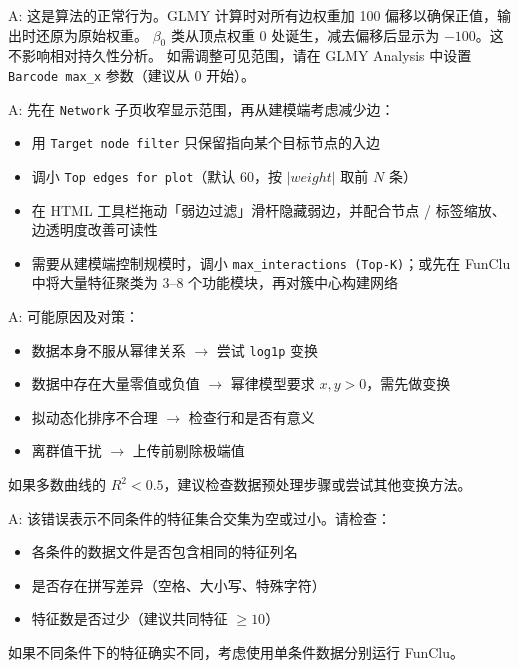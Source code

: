\documentclass[12pt,a4paper]{ctexart}
\newcommand{\tab}[1]{\texttt{#1}}
\newcommand{\param}[1]{\texttt{#1}}
\begin{document}
\medskip
\begin{infobox}
    A: 这是算法的正常行为。GLMY 计算时对所有边权重加 100 偏移以确保正值，输出时还原为原始权重。
    $\beta_0$ 类从顶点权重 0 处诞生，减去偏移后显示为 $-100$。这不影响相对持久性分析。
    如需调整可见范围，请在 GLMY Analysis 中设置 \param{Barcode max\_x} 参数（建议从 0 开始）。
\end{infobox}

\medskip
\begin{infobox}
    A: 先在 \tab{Network} 子页收窄显示范围，再从建模端考虑减少边：
    \begin{itemize}
        \item 用 \param{Target node filter} 只保留指向某个目标节点的入边
        \item 调小 \param{Top edges for plot}（默认 60，按 $|weight|$ 取前 $N$ 条）
        \item 在 HTML 工具栏拖动「弱边过滤」滑杆隐藏弱边，并配合节点 / 标签缩放、边透明度改善可读性
        \item 需要从建模端控制规模时，调小 \param{max\_interactions (Top-K)}；或先在 FunClu 中将大量特征聚类为 3--8 个功能模块，再对簇中心构建网络
    \end{itemize}
\end{infobox}

\medskip
\begin{infobox}
    A: 可能原因及对策：
    \begin{itemize}
        \item 数据本身不服从幂律关系 $\rightarrow$ 尝试 \param{log1p} 变换
        \item 数据中存在大量零值或负值 $\rightarrow$ 幂律模型要求 $x, y > 0$，需先做变换
        \item 拟动态化排序不合理 $\rightarrow$ 检查行和是否有意义
        \item 离群值干扰 $\rightarrow$ 上传前剔除极端值
    \end{itemize}
    如果多数曲线的 $R^2 < 0.5$，建议检查数据预处理步骤或尝试其他变换方法。
\end{infobox}

\medskip
\begin{infobox}
    A: 该错误表示不同条件的特征集合交集为空或过小。请检查：
    \begin{itemize}
        \item 各条件的数据文件是否包含相同的特征列名
        \item 是否存在拼写差异（空格、大小写、特殊字符）
        \item 特征数是否过少（建议共同特征 $\geq 10$）
    \end{itemize}
    如果不同条件下的特征确实不同，考虑使用单条件数据分别运行 FunClu。
\end{infobox}
\end{document}
